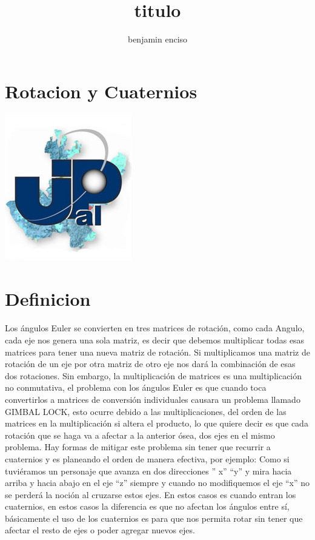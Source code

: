 \documentclass[12pt,letterpaper]{article}
\author{benjamin enciso}
\title{titulo}
\begin{document}
\section{Rotacion y Cuaternios}
\includegraphics[scale=1]{../up1.jpg} 
\section{Definicion}
Los ángulos Euler se convierten en tres matrices de rotación, como cada Angulo, cada eje nos genera una sola matriz, es decir que debemos multiplicar todas esas matrices para tener una nueva matriz de rotación. Si multiplicamos una matriz de rotación de un eje por otra matriz de otro eje nos dará la combinación de esas dos rotaciones.
Sin embargo, la multiplicación de matrices es una multiplicación no conmutativa, el problema con los ángulos Euler es que cuando toca convertirlos a matrices de conversión individuales causara un problema llamado GIMBAL LOCK, esto ocurre debido a las multiplicaciones, del orden de las matrices en la multiplicación si altera el producto, lo que quiere decir es que cada rotación que se haga va a afectar a la anterior ósea, dos ejes en el mismo problema.
Hay formas de mitigar este problema sin tener que recurrir a cuaternios y es planeando el orden de manera efectiva, por ejemplo:
Como si tuviéramos un personaje que avanza en dos direcciones  ” x” “y”  y mira hacia arriba y hacia abajo en el eje “z” siempre y cuando no modifiquemos el eje “x” no se perderá la noción al cruzarse estos ejes. En estos casos es cuando entran los cuaternios, en estos casos la diferencia es que no afectan los ángulos entre sí, básicamente el uso de los cuaternios es para que nos permita rotar sin tener que afectar el resto de ejes o poder agregar nuevos ejes.
\end{document}
